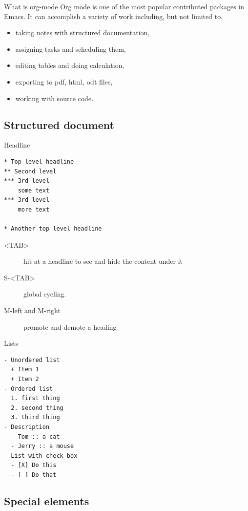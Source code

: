 \documentclass[presentation]{beamer}
\begin{document}
\begin{frame}[label={sec:org5b9e813}]{What is org-mode}
Org mode is one of the most popular contributed packages in Emacs. It
can accomplish a variety of work including, but not limited to,

\begin{itemize}
\item taking notes with structured documentation,
\item assigning tasks and scheduling them,
\item editing tables and doing calculation,
\item exporting to pdf, html, odt files,
\item \alert{working with source code}.
\end{itemize}
\end{frame}


\subsection{Structured document}
\label{sec:org6d22182}

\begin{frame}[fragile,label={sec:orge23869c}]{Headline}
 \begin{verbatim}
* Top level headline
** Second level
*** 3rd level
    some text
*** 3rd level
    more text

* Another top level headline
\end{verbatim}

\begin{description}
\item[{<TAB>}] hit at a headline to see and hide the content under it
\item[{S-<TAB>}] global cycling.
\item[{M-left and M-right}] promote and demote a heading
\end{description}
\end{frame}

\begin{frame}[fragile,label={sec:org3bb7748}]{Lists}
 \begin{verbatim}
- Unordered list
  + Item 1
  + Item 2
- Ordered list
  1. first thing
  2. second thing
  3. third thing
- Description
  - Tom :: a cat
  - Jerry :: a mouse
- List with check box
  - [X] Do this
  - [ ] Do that
\end{verbatim}
\end{frame}


\subsection{Special elements}
\label{sec:orgd427fc3}
\end{document}
